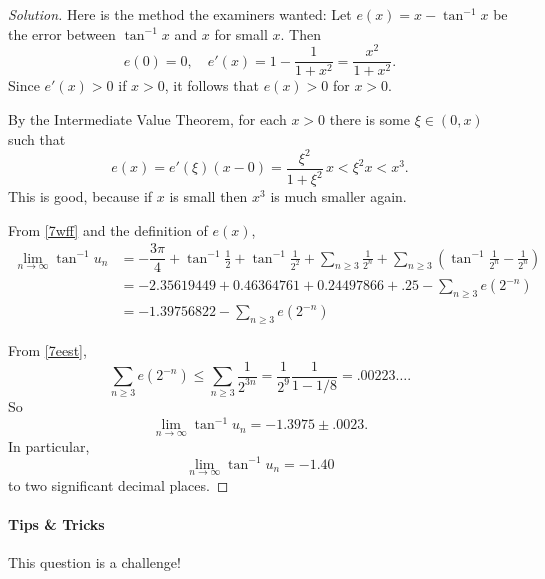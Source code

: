 \documentclass[11pt,a4paper]{report}
\theoremstyle{plain}
\theoremstyle{definition}
\begin{document}
\begin{proof}[Solution]
\medskip
Here is the method the examiners wanted:
Let $ e(x) = x - \tan^{-1}x   $ be the error between $ \tan^{-1}x $ and $ x $ for small $ x $.   
Then
\[
e(0)=0  ,   \quad   e'(x) = 1 - \frac{1 }{1+x^2}  = \frac{x^2}{1+x^2}.
\]
Since $ e'(x) >0 $ if $ x>0 $,  it follows that $ e(x) > 0 $ for $ x > 0 $.

By the Intermediate Value Theorem, for each $ x> 0$  there is some $ \xi \in (0,x) $ 
such that 
\begin{equation} \label{7eest} 
e(x)   = e'(\xi ) (x-0)   = \frac{\xi^2}{1+\xi^2}\,  x  <   \xi^2 x <       x^3 .
\end{equation} 
This is good, because if $ x $ is small then $ x^3 $ is much smaller again.

From \eqref{7wff} and the definition of $ e(x) $, 
\begin{equation} \label{}
\begin{aligned}   
 \lim_{n\to\infty } \tan^{-1} u_n &= -\dfrac{3\pi}{4} + \tan^{-1} \frac{1}{2} + \tan^{-1}\frac{1}{2^2} + \sum_{n\geq 3} \frac{1}{2^n } 
 				+ \sum_{n\geq 3} \left( \tan^{-1} \frac{1}{2^n} - \frac{1}{2^n} \right) \\
  		&= -2.35619449  + 0.46364761 + 0.24497866 + .25 - \sum_{n\geq 3} e(2^{-n}) \\
		&= -1.39756822 - \sum_{n\geq 3} e(2^{-n})
\end{aligned} 		
\end{equation}  

From \eqref{7eest},
\[
\sum_{n\geq 3} e(2^{-n}) \leq  \sum_{n\geq 3} \frac{1}{2^{3n}} = \frac{1}{2^9} \frac{1}{1-1/8} = .00223 \dots .
\] 
So
\[   \lim_{n\to\infty } \tan^{-1} u_n = -1.3975 \pm .0023. \]
In particular, 
\begin{equation} \label{7ge}
  \lim_{n\to\infty } \tan^{-1} u_n = -1.40
  \end{equation} 
to two significant decimal places.
\end{proof}


\bigskip

\paragraph{Tips \& Tricks} This question is a challenge!
\end{document}
